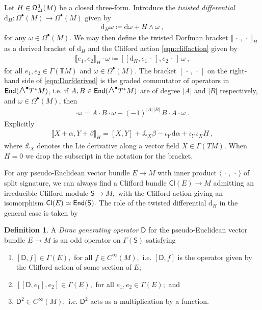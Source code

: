 \documentclass[a4paper, reqno, 11pt]{amsart}
\numberwithin{equation}{section}
\theoremstyle{definition}
\newtheorem{definition}[equation]{Definition}
\newcommand{\cbrak}[1]{\llbracket #1 \rrbracket}
\newcommand{\ip}[1]{\langle #1 \rangle}
\newcommand{\de}{\mathrm{d}}
\newcommand{\IT}{\mathbb{T}}
\newcommand{\Cl}{\mathsf{Cl}}
\newcommand{\sfD}{{\mathsf{D}}}
\newcommand{\sfS}{{\mathsf{S}}}
\newcommand{\sfGamma}{{\mathsf{\Gamma}}}
\newcommand{\sfOmega}{{\mathsf{\Omega}}}
\newcommand{\midwedge}{\text {\Large$\wedge$}}
\theoremstyle{remark}
\begin{document}
Let $H \in \sfOmega_{\tt cl}^3(M)$ be a closed three-form. Introduce the \emph{twisted differential} $\de_H \colon \sfOmega^\bullet(M) \to \sfOmega^\bullet(M)$ given by 
\begin{align}
    \de_H \omega \coloneqq \de \omega + H \wedge \omega \ ,
\end{align}
for any $\omega \in \sfOmega^\bullet(M).$ We may then define the twisted Dorfman bracket $\cbrak{ \,\cdot \,,\, \cdot\,}_H$ as a derived bracket of $\de_H$ and the Clifford action \eqref{eqn:cliffaction} given by
\begin{align}\label{eqn:Dorfderived}
    \cbrak{e_1, e_2}_H \cdot \omega \coloneqq [[\de_H , e_1 \,\cdot\,], e_2 \,\cdot\, ] \, \omega \ ,
\end{align}
for all $e_1, e_2 \in \sfGamma(\IT M)$ and $\omega \in \sfOmega^\bullet(M)$. The bracket $[\,\cdot\,,\,\cdot\,]$ on the right-hand side of \eqref{eqn:Dorfderived} is the graded commutator of operators in ${\sf End}(\midwedge^\bullet T^*M)$, i.e. if $A,B \in {\sf End}(\midwedge^\bullet T^*M)$ are of degree $|A|$ and $|B|$ respectively, and $\omega \in \sfOmega^\bullet(M)$, then
\begin{align}
    [A,B] \cdot \omega= A\cdot B\cdot \omega - (-1)^{|A|\, |B|}\, B\cdot A\cdot \omega \ .
\end{align}
Explicitly
\begin{align}\label{eqn:Hbracket}
    \llbracket X + \alpha, Y + \beta \rrbracket_H = [X,Y] + \pounds_X \beta - \iota_Y\, \de \alpha + \iota_Y\, \iota_X H \ ,
\end{align}
where $\pounds_X$ denotes the Lie derivative along a vector field $X\in\sfGamma(TM)$. When $H=0$ we drop the subscript in the notation for the bracket.

For any pseudo-Euclidean vector bundle $E \to M$ with inner product $\ip{\,\cdot \, , \, \cdot\,}$ of split signature, we can always find a Clifford bundle $\Cl(E) \to M$ admitting an irreducible Clifford module $\sfS \to M,$ with the Clifford action giving an isomorphism $\Cl(E) \simeq {\sf End}(\sfS).$ The role of the twisted differential $\de_H$ in the general case is taken by

\begin{definition} \label{def:dgo}
    A \emph{Dirac generating operator} $\sfD$ for the pseudo-Euclidean vector bundle $E \to M$ is an odd operator on $\sfGamma(\sfS)$ satisfying
    \begin{enumerate}
        \item $[\sfD, f] \in \sfGamma(E),$ for all $f \in C^\infty(M),$ i.e. $[\sfD,f]$ is the operator given by the Clifford action of some section of $E;$ \\[-3mm]
        \item $[[\sfD, e_1], e_2] \in \sfGamma(E),$ for all $e_1, e_2 \in \sfGamma(E);$ and \\[-3mm]
        \item $\sfD^2 \in C^\infty(M),$ i.e. $\sfD^2$ acts as a multiplication by a function.
    \end{enumerate}
\end{definition}
\end{document}
